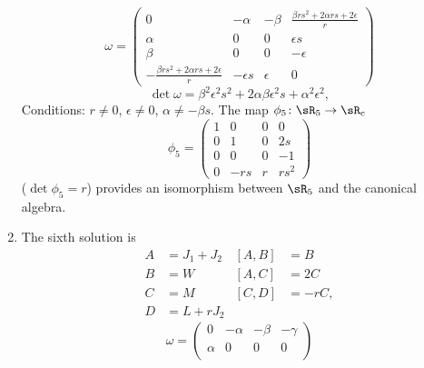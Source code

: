 \begin{enumerate}
	      \begin{equation}
		      \omega=\begin{pmatrix}
			      0                                                  & -\alpha     & -\beta   & \frac{ \beta r s^{2}+2\alpha r s+2\epsilon }{ r } \\
			      \alpha                                             & 0           & 0        & \epsilon s                                        \\
			      \beta                                              & 0           & 0        & -\epsilon                                         \\
			      -\frac{ \beta r s^{2}+2\alpha r s+2\epsilon }{ r } & -\epsilon s & \epsilon & 0
		      \end{pmatrix}
	      \end{equation}
	      \begin{equation}
		      \det\omega=\beta^{2}\epsilon^{2}s^{2}+2\alpha\beta\epsilon^{2}s+\alpha^{2}\epsilon^{2},
	      \end{equation}
	      Conditions:  $r\neq 0$, $\epsilon\neq 0$, $\alpha\neq -\beta s$.  The map $\phi_5\colon \sR_5\to \sR_c$
	      \begin{equation}
		      \phi_{5}=
		      \begin{pmatrix}
			      1 & 0   & 0 & 0      \\
			      0 & 1   & 0 & 2s     \\
			      0 & 0   & 0 & -1     \\
			      0 & -rs & r & rs^{2}
		      \end{pmatrix}
	      \end{equation}
	      ($\det\phi_{5}=r$) provides an isomorphism between $\sR_{5}$ and the canonical algebra.
	\item The sixth solution is
	      \begin{align*}
		      A & =J_{1}+J_{2} & [A,B] & =B    \\
		      B & =W           & [A,C] & =2C   \\
		      C & =M           & [C,D] & =-rC, \\
		      D & =L+rJ_{2}
	      \end{align*}
	      \begin{equation}
		      \omega=\begin{pmatrix}
			      0      & -\alpha & -\beta               & -\gamma             \\
			      \alpha & 0       & 0                    & 0                   \\

\end{pmatrix}
\end{equation}
\end{enumerate}

